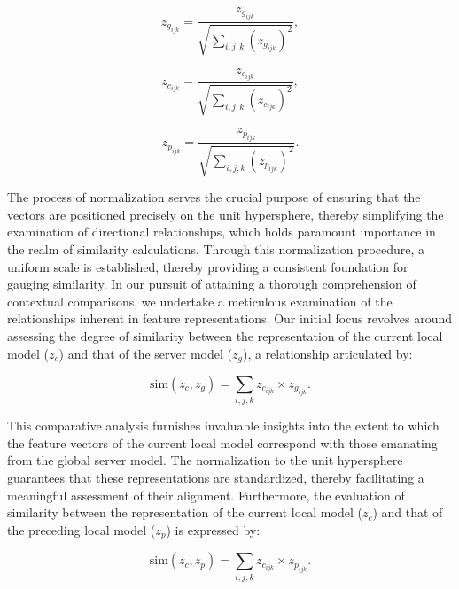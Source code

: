 \begin{equation}
    z_{g_{ijk}} = \frac{z_{g_{ijk}}}{\sqrt{\sum_{i,j,k} (z_{g_{ijk}})^2}},
\end{equation}

\begin{equation}
    z_{c_{ijk}} = \frac{z_{c_{ijk}}}{\sqrt{\sum_{i,j,k} (z_{c_{ijk}})^2}},
\end{equation}

\begin{equation}
    z_{p_{ijk}} = \frac{z_{p_{ijk}}}{\sqrt{\sum_{i,j,k} (z_{p_{ijk}})^2}}.
\end{equation}

The process of normalization serves the crucial purpose of ensuring that the vectors are positioned precisely on the unit hypersphere, thereby simplifying the examination of directional relationships, which holds paramount importance in the realm of similarity calculations. Through this normalization procedure, a uniform scale is established, thereby providing a consistent foundation for gauging similarity. In our pursuit of attaining a thorough comprehension of contextual comparisons, we undertake a meticulous examination of the relationships inherent in feature representations. Our initial focus revolves around assessing the degree of similarity between the representation of the current local model (\(z_c\)) and that of the server model (\(z_g\)), a relationship articulated by:

\begin{equation} \label{eq: sim_zc_zg}
     \text{sim}(z_c, z_g) = \sum_{i,j,k} z_{c_{ijk}} \times z_{g_{ijk}}.
\end{equation}

This comparative analysis furnishes invaluable insights into the extent to which the feature vectors of the current local model correspond with those emanating from the global server model. The normalization to the unit hypersphere guarantees that these representations are standardized, thereby facilitating a meaningful assessment of their alignment. Furthermore, the evaluation of similarity between the representation of the current local model (\(z_c\)) and that of the preceding local model (\(z_p\)) is expressed by:

\begin{equation} \label{eq: sim_zc_zp}
     \text{sim}(z_c, z_p) = \sum_{i,j,k} z_{c_{ijk}} \times z_{p_{ijk}}.
\end{equation}

